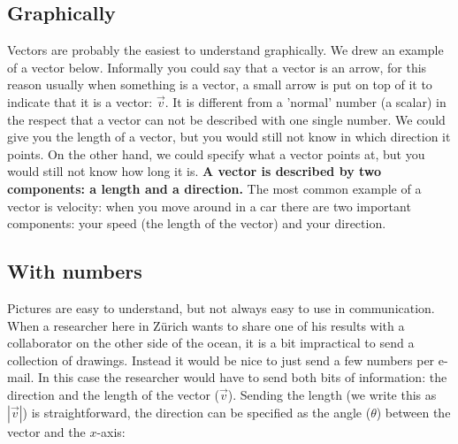 \documentclass[a4paper]{report}
\begin{document}
\subsection{Graphically}
Vectors are probably the easiest to understand graphically. We drew an example of a vector below. Informally you could say that a vector is an arrow, for this reason usually when something is a vector, a small arrow is put on top of it to indicate that it is a vector: $\vec{v}$. It is different from a 'normal' number (a scalar) in the respect that a vector can not be described with one single number. We could give you the length of a vector, but you would still not know in which direction it points. On the other hand, we could specify what a vector points at, but you would still not know how long it is. \textbf{A vector is described by two components: a length and a direction.} The most common example of a vector is velocity: when you move around in a car there are two important components: your speed (the length of the vector) and your direction. \newline
\begin{center}
\end{center}
\subsection{With numbers} 
Pictures are easy to understand, but not always easy to use in communication. When a researcher here in Z\"urich wants to share one of his results with a collaborator on the other side of the ocean, it is a bit impractical to send a collection of drawings. Instead it would be nice to just send a few numbers per e-mail. In this case the researcher would have to send both bits of information: the direction and the length of the vector ($\vec{v}$). Sending the length (we write this as $\left|\vec{v}\right|$) is straightforward, the direction can be specified as the angle ($\theta$) between the vector and the $x$-axis:

\begin{center}
\end{center}
\end{document}
